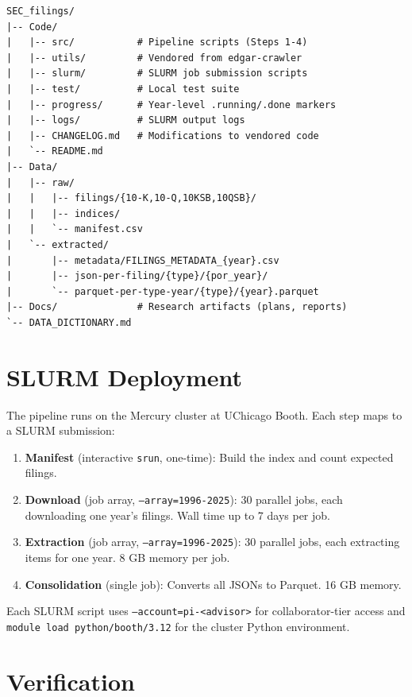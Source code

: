 \documentclass[11pt]{article}
\begin{document}
\begin{lstlisting}[style=bash]
SEC_filings/
|-- Code/
|   |-- src/           # Pipeline scripts (Steps 1-4)
|   |-- utils/         # Vendored from edgar-crawler
|   |-- slurm/         # SLURM job submission scripts
|   |-- test/          # Local test suite
|   |-- progress/      # Year-level .running/.done markers
|   |-- logs/          # SLURM output logs
|   |-- CHANGELOG.md   # Modifications to vendored code
|   `-- README.md
|-- Data/
|   |-- raw/
|   |   |-- filings/{10-K,10-Q,10KSB,10QSB}/
|   |   |-- indices/
|   |   `-- manifest.csv
|   `-- extracted/
|       |-- metadata/FILINGS_METADATA_{year}.csv
|       |-- json-per-filing/{type}/{por_year}/
|       `-- parquet-per-type-year/{type}/{year}.parquet
|-- Docs/              # Research artifacts (plans, reports)
`-- DATA_DICTIONARY.md
\end{lstlisting}

\section{SLURM Deployment}

The pipeline runs on the Mercury cluster at UChicago Booth. Each step maps to a SLURM submission:

\begin{enumerate}
  \item \textbf{Manifest} (interactive \texttt{srun}, one-time): Build the index and count expected filings.
  \item \textbf{Download} (job array, \texttt{--array=1996-2025}): 30 parallel jobs, each downloading one year's filings. Wall time up to 7 days per job.
  \item \textbf{Extraction} (job array, \texttt{--array=1996-2025}): 30 parallel jobs, each extracting items for one year. 8 GB memory per job.
  \item \textbf{Consolidation} (single job): Converts all JSONs to Parquet. 16 GB memory.
\end{enumerate}

Each SLURM script uses \texttt{--account=pi-<advisor>} for collaborator-tier access and \texttt{module load python/booth/3.12} for the cluster Python environment.

\section{Verification}
\end{document}
